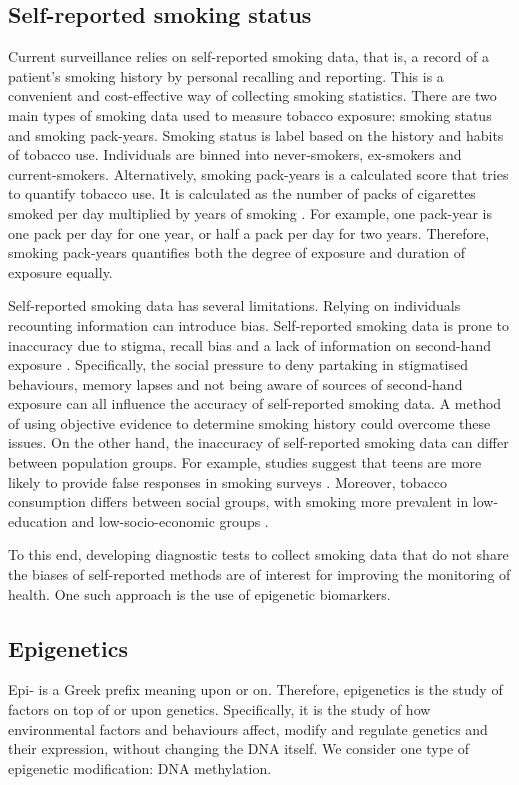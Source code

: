 \documentclass[draft]{article} %
\begin{document}
\subsection{Self-reported smoking status} \label{sec:srss}
Current surveillance relies on self-reported smoking data, that is, a record of a patient's smoking history by personal recalling and reporting. This is a convenient and cost-effective way of collecting smoking statistics. There are two main types of smoking data used to measure tobacco exposure: smoking status and smoking pack-years. Smoking status is label based on the history and habits of tobacco use. Individuals are binned into never-smokers, ex-smokers and current-smokers. Alternatively, smoking pack-years is a calculated score that tries to quantify tobacco use. It is calculated as the number of packs of cigarettes smoked per day multiplied by years of smoking \cite{smokingpackyears}. For example, one pack-year is one pack per day for one year, or half a pack per day for two years. Therefore, smoking pack-years quantifies both the degree of exposure and duration of exposure equally.

Self-reported smoking data has several limitations. Relying on individuals recounting information can introduce bias. Self-reported smoking data is prone to inaccuracy due to stigma, recall bias and a lack of information on second-hand exposure \cite{park2015correlation, gorber2009accuracy}. Specifically, the social pressure to deny partaking in stigmatised behaviours, memory lapses and not being aware of sources of second-hand exposure can all influence the accuracy of self-reported smoking data. A method of using objective evidence to determine smoking history could overcome these issues. On the other hand, the inaccuracy of self-reported smoking data can differ between population groups. For example, studies suggest that teens are more likely to provide false responses in smoking surveys \cite{park2015correlation}. Moreover, tobacco consumption differs between social groups, with smoking more prevalent in low-education and low-socio-economic groups \cite{cdc2019_smoking}.

To this end, developing diagnostic tests to collect smoking data that do not share the biases of self-reported methods are of interest for improving the monitoring of health. One such approach is the use of epigenetic biomarkers.

\subsection{Epigenetics}
Epi- is a Greek prefix meaning upon or on. Therefore, epigenetics is the study of factors on top of or upon genetics. Specifically, it is the study of how environmental factors and behaviours affect, modify and regulate genetics and their expression, without changing the DNA itself. We consider one type of epigenetic modification: DNA methylation.
\end{document}
